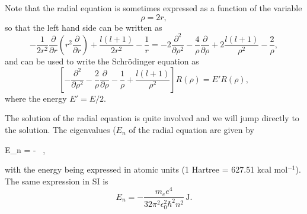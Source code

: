\documentclass[../Main/chem331-notes.tex]{subfiles}
\begin{document}
Note that the radial equation is sometimes expressed as a function of the variable
\begin{equation}
\rho = 2r,
\end{equation}
so that the left hand side can be written as
\begin{equation}
-\frac{1}{2r^2} \frac{\partial}{\partial r} \left( r^2 \frac{\partial  }{\partial r} \right) + \frac{l(l+1)}{2r^2} - \frac{1}{r}
= -2 \frac{\partial^2}{\partial \rho^2}
-\frac{4}{\rho} \frac{\partial}{\partial \rho} + 2\frac{l(l+1)}{\rho^2} - \frac{2}{\rho},
\end{equation}
and can be used to write the Schr\"{o}dinger equation as
\begin{equation}
\left[
-\frac{\partial^2 }{\partial \rho^2}
-\frac{2}{\rho}\frac{\partial }{\partial \rho}
-\frac{1}{\rho} + \frac{l(l+1)}{\rho^2} \right] R(\rho) = E' R(\rho),
\end{equation}
where the energy $E' = E / 2$.

The solution of the radial equation is quite involved and we will jump directly to the solution. The eigenvalues ($E_n$ of the radial equation are given by
\begin{iequation}
E_n = -   \, ,
\end{iequation}
with the energy being expressed in atomic units (1 Hartree = 627.51 kcal mol$^{-1}$).
The same expression in SI is
\begin{equation}
E_n = - \frac{m_e e^4}{32 \pi^2\epsilon_0^2 \hbar^2 n^2} \, \mathrm{J}.
\end{equation}
\end{document}
